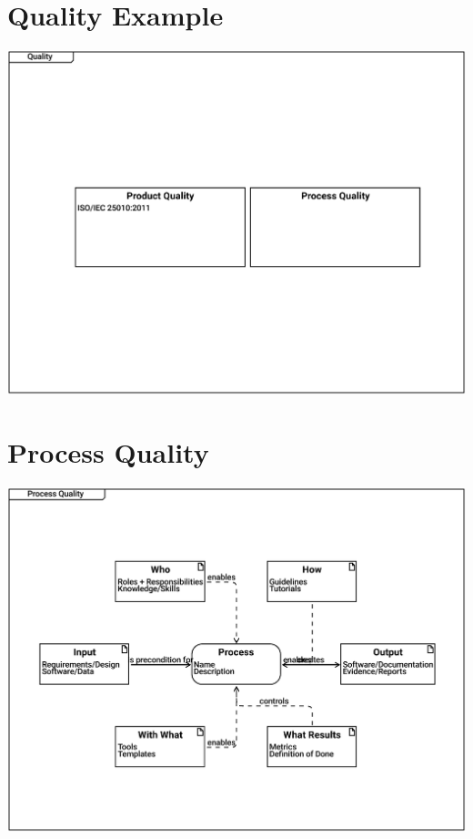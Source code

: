 \documentclass{article}
\begin{document}
\section{Quality Example}

\includegraphics[width= 1.0\linewidth]{quality_export/D0001_Quality.pdf}


\section{Process Quality}

\includegraphics[width= 1.0\linewidth]{quality_export/D0003_Process_Quality.pdf}

\end{document}
